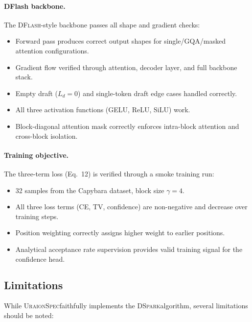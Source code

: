 \documentclass[11pt,a4paper]{article}
\newcommand{\UraionSpec}{\textsc{UraionSpec}}
\newcommand{\DSpark}{\textsc{DSpark}}
\newcommand{\DFlash}{\textsc{DFlash}}
\begin{document}
\paragraph{DFlash backbone.}
The \DFlash-style backbone passes all shape and gradient checks:
\begin{itemize}
  \item Forward pass produces correct output shapes for single/GQA/masked
    attention configurations.
  \item Gradient flow verified through attention, decoder layer, and full
    backbone stack.
  \item Empty draft ($L_d=0$) and single-token draft edge cases handled correctly.
  \item All three activation functions (GELU, ReLU, SiLU) work.
  \item Block-diagonal attention mask correctly enforces intra-block
    attention and cross-block isolation.
\end{itemize}

\paragraph{Training objective.}
The three-term loss (Eq.~12) is verified through a smoke training run:
\begin{itemize}
  \item 32 samples from the Capybara dataset, block size $\gamma=4$.
  \item All three loss terms (CE, TV, confidence) are non-negative and
    decrease over training steps.
  \item Position weighting correctly assigns higher weight to earlier
    positions.
  \item Analytical acceptance rate supervision provides valid training
    signal for the confidence head.
\end{itemize}

\subsection{Limitations}
\label{subsec:limitations}

While \UraionSpec faithfully implements the \DSpark algorithm, several
limitations should be noted:
\end{document}

